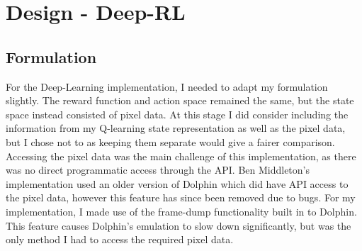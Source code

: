 \chapter{Design - Deep-RL}
\section{Formulation}
For the Deep-Learning implementation, I needed to adapt my formulation slightly. The reward function and action space remained the same, but the state space instead consisted of pixel data. At this stage I did consider including the information from my Q-learning state representation as well as the pixel data, but I chose not to as keeping them separate would give a fairer comparison. Accessing the pixel data was the main challenge of this implementation, as there was no direct programmatic access through the API. Ben Middleton's implementation \cite{BenJMiddleton} used an older version of Dolphin which did have API access to the pixel data, however this feature has since been removed due to bugs. For my implementation, I made use of the frame-dump functionality built in to Dolphin. This feature causes Dolphin's emulation to slow down significantly, but was the only method I had to access the required pixel data.
